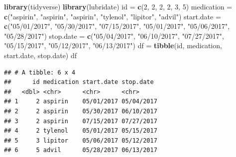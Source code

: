\documentclass[
]{book}
\newenvironment{Shaded}{\begin{snugshade}}{\end{snugshade}}
\newcommand{\CommentTok}[1]{\textcolor[rgb]{0.56,0.35,0.01}{\textit{#1}}}
\newcommand{\DataTypeTok}[1]{\textcolor[rgb]{0.13,0.29,0.53}{#1}}
\newcommand{\DecValTok}[1]{\textcolor[rgb]{0.00,0.00,0.81}{#1}}
\newcommand{\KeywordTok}[1]{\textcolor[rgb]{0.13,0.29,0.53}{\textbf{#1}}}
\newcommand{\NormalTok}[1]{#1}
\newcommand{\OperatorTok}[1]{\textcolor[rgb]{0.81,0.36,0.00}{\textbf{#1}}}
\newcommand{\StringTok}[1]{\textcolor[rgb]{0.31,0.60,0.02}{#1}}
\begin{document}
\begin{Shaded}
\begin{Highlighting}[]
\KeywordTok{library}\NormalTok{(tidyverse)}
\KeywordTok{library}\NormalTok{(lubridate)}
\NormalTok{id =}\StringTok{ }\KeywordTok{c}\NormalTok{(}\DecValTok{2}\NormalTok{, }\DecValTok{2}\NormalTok{, }\DecValTok{2}\NormalTok{, }\DecValTok{2}\NormalTok{, }\DecValTok{3}\NormalTok{, }\DecValTok{5}\NormalTok{) }
\NormalTok{medication =}\StringTok{ }\KeywordTok{c}\NormalTok{(}\StringTok{"aspirin"}\NormalTok{, }\StringTok{"aspirin"}\NormalTok{, }\StringTok{"aspirin"}\NormalTok{, }\StringTok{"tylenol"}\NormalTok{, }\StringTok{"lipitor"}\NormalTok{, }\StringTok{"advil"}\NormalTok{) }
\NormalTok{start.date =}\StringTok{ }\KeywordTok{c}\NormalTok{(}\StringTok{"05/01/2017"}\NormalTok{, }\StringTok{"05/30/2017"}\NormalTok{, }\StringTok{"07/15/2017"}\NormalTok{, }\StringTok{"05/01/2017"}\NormalTok{, }\StringTok{"05/06/2017"}\NormalTok{, }\StringTok{"05/28/2017"}\NormalTok{)}
\NormalTok{stop.date =}\StringTok{ }\KeywordTok{c}\NormalTok{(}\StringTok{"05/04/2017"}\NormalTok{, }\StringTok{"06/10/2017"}\NormalTok{, }\StringTok{"07/27/2017"}\NormalTok{, }\StringTok{"05/15/2017"}\NormalTok{, }\StringTok{"05/12/2017"}\NormalTok{, }\StringTok{"06/13/2017"}\NormalTok{)}
\NormalTok{df =}\StringTok{ }\KeywordTok{tibble}\NormalTok{(id, medication, start.date, stop.date)}
\NormalTok{df}
\end{Highlighting}
\end{Shaded}

\begin{verbatim}
## # A tibble: 6 x 4
##      id medication start.date stop.date 
##   <dbl> <chr>      <chr>      <chr>     
## 1     2 aspirin    05/01/2017 05/04/2017
## 2     2 aspirin    05/30/2017 06/10/2017
## 3     2 aspirin    07/15/2017 07/27/2017
## 4     2 tylenol    05/01/2017 05/15/2017
## 5     3 lipitor    05/06/2017 05/12/2017
## 6     5 advil      05/28/2017 06/13/2017
\end{verbatim}

\begin{Shaded}
\end{Shaded}
\end{document}
